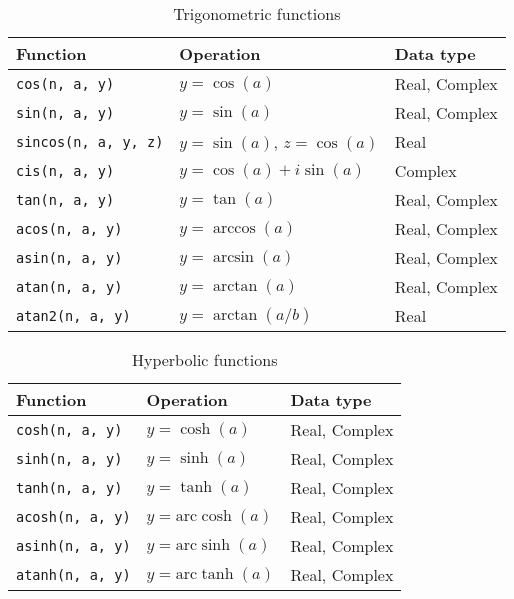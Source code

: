 \begin{table}
  \begin{tabularx}{\textwidth}{LLL}
    \toprule
    Function & Operation & Data type \\
    \midrule
    \texttt{cos(n, a, y)}       & $y = \cos(a)$        & Real, Complex \\
    \texttt{sin(n, a, y)}       & $y = \sin(a)$        & Real, Complex \\
    \texttt{sincos(n, a, y, z)} & $y = \sin(a)$, $z = \cos(a)$ & Real  \\
    \texttt{cis(n, a, y)}       & $y = \cos(a) + i\sin(a)$   & Complex \\
    \texttt{tan(n, a, y)}       & $y = \tan(a)$        & Real, Complex \\
    \texttt{acos(n, a, y)}      & $y = \arccos(a)$     & Real, Complex \\
    \texttt{asin(n, a, y)}      & $y = \arcsin(a)$     & Real, Complex \\
    \texttt{atan(n, a, y)}      & $y = \arctan(a)$     & Real, Complex \\
    \texttt{atan2(n, a, y)}     & $y = \arctan(a / b)$ & Real          \\
    \bottomrule
  \end{tabularx}
  \caption{Trigonometric functions}
  \label{tab:Trigonometric functions}
\end{table}

\begin{table}
  \begin{tabularx}{\textwidth}{LLL}
    \toprule
    Function & Operation & Data type \\
    \midrule
    \texttt{cosh(n, a, y)}  & $y = \cosh(a)$             & Real, Complex \\
    \texttt{sinh(n, a, y)}  & $y = \sinh(a)$             & Real, Complex \\
    \texttt{tanh(n, a, y)}  & $y = \tanh(a)$             & Real, Complex \\
    \texttt{acosh(n, a, y)} & $y = \mathrm{arc}\cosh(a)$ & Real, Complex \\
    \texttt{asinh(n, a, y)} & $y = \mathrm{arc}\sinh(a)$ & Real, Complex \\
    \texttt{atanh(n, a, y)} & $y = \mathrm{arc}\tanh(a)$ & Real, Complex \\
    \bottomrule
  \end{tabularx}
  \caption{Hyperbolic functions}
  \label{tab:Hyperbolic functions}
\end{table}

